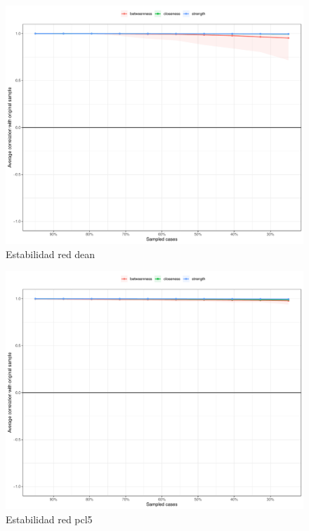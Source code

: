 \documentclass[11pt,spanish]{article}\usepackage[]{graphicx}\usepackage[]{color}
\begin{document}
\begin{figure}[ht]
\centering
\includegraphics[scale=0.5]{images/estability_dean.pdf}
\caption{Estabilidad red dean}
\label{fig:estabilidad_dean}
\end{figure}

\begin{figure}[ht]
\centering
\includegraphics[scale=0.5]{images/estability_pcl5.pdf}
\caption{Estabilidad red pcl5}
\label{fig:estabilidad_pcl5}
\end{figure}
\end{document}
